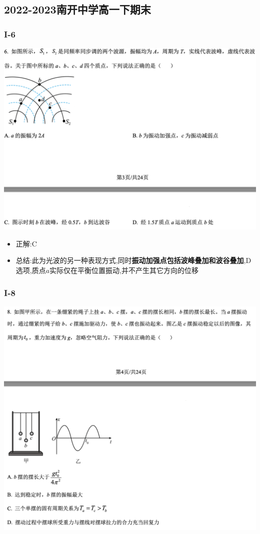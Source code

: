 \documentclass{article}
\begin{document}
        \subsection{2022-2023南开中学高一下期末}
        \subsubsection{I-6}
        \includegraphics[width=50em,keepaspectratio]{./pictures/1.3-8.png}
        
        \begin{itemize}
            \item 正解:\quad C
            \item 总结:\quad 此为光波的另一种表现方式,同时\textbf{振动加强点包括波峰叠加和波谷叠加},D选项,质点$a$实际仅在平衡位置振动,并不产生其它方向的位移
        \end{itemize}


        \subsubsection{I-8}
        \includegraphics[width=50em,keepaspectratio]{./pictures/1.3-9.png}
        
\end{document}
